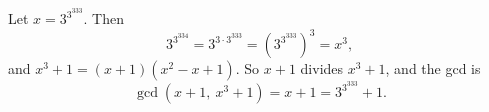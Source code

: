 Let $x=3^{3^{333}}$. Then
\[3^{3^{334}}=3^{3\cdot3^{333}}=\left(3^{3^{333}}\right)^3=x^3,\]
and $x^3+1=(x+1)\left(x^2-x+1\right)$. So $x+1$ divides $x^3+1$, and the gcd is
\[\gcd\left(x+1,\ x^3+1\right)=x+1=\boxed{3^{3^{333}}+1}.\]
